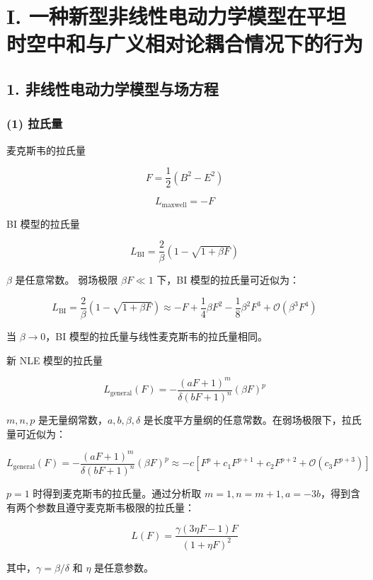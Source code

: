 \documentclass[aps,prl,preprint,groupedaddress]{revtex4-2}
\begin{document}
\section{I. 一种新型非线性电动力学模型在平坦时空中和与广义相对论耦合情况下的行为}

\subsection{1. 非线性电动力学模型与场方程}

\subsubsection{(1) 拉氏量}

麦克斯韦的拉氏量

$$
F
=\frac{1 }{2 } (B^2-E^2)
$$

$$
L_{\mathrm{maxwell}}
=-F
$$

BI 模型的拉氏量\cite{born1934quantum}

$$
L_{\mathrm{BI}}
=\frac{2 }{\beta } \left(1-\sqrt{1+\beta F} \right) 
$$

$\beta $ 是任意常数。   弱场极限 $\beta F\ll 1 $ 下，BI 模型的拉氏量可近似为：

$$
L_{\mathrm{BI}}
=\frac{2 }{\beta } \left(1-\sqrt{1+\beta F} \right)
\approx -F + \frac{1 }{4 } \beta F^2 - \frac{1 }{8 } \beta^2 F^3 +\mathcal{O}\left(\beta^3 F^4 \right) 
$$

当 $\beta\to 0 $，BI 模型的拉氏量与线性麦克斯韦的拉氏量相同。

新 NLE 模型的拉氏量

$$
L_{\mathrm{general}}(F)
=-\frac{\left(aF+1 \right)^m }{\delta(bF+1)^n } \left(\beta F \right)^p
$$

$m,n,p $ 是无量纲常数，$a,b,\beta,\delta $ 是长度平方量纲的任意常数。在弱场极限下，拉氏量可近似为：

$$
L_{\mathrm{general}}(F)
=-\frac{\left(aF+1 \right)^m }{\delta(bF+1)^n } \left(\beta F \right)^p
\approx -c\left[F^p + c_1 F^{p+1} +c_2 F^{p+2}  + \mathcal{O}\left(c_3 F^{p+3} \right) \right]
$$

$p=1 $ 时得到麦克斯韦的拉氏量。通过分析取 $m=1,n=m+1,a=-3b $，得到含有两个参数且遵守麦克斯韦极限的拉氏量：

$$
L(F)
=\frac{\gamma(3\eta F - 1 )F }{(1+\eta F)^2 }
$$

其中，$\gamma=\beta/\delta $ 和 $\eta $ 是任意参数。
\end{document}
